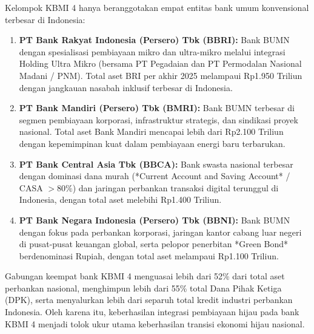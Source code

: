 \documentclass[12pt,a4paper]{article}
\numberwithin{equation}{section}
\begin{document}
\noindent
Kelompok KBMI 4 hanya beranggotakan empat entitas bank umum konvensional terbesar di Indonesia:
\begin{enumerate}
  \item \textbf{PT Bank Rakyat Indonesia (Persero) Tbk (BBRI):} Bank BUMN dengan spesialisasi pembiayaan mikro dan ultra-mikro melalui integrasi Holding Ultra Mikro (bersama PT Pegadaian dan PT Permodalan Nasional Madani / PNM). Total aset BRI per akhir 2025 melampaui Rp1.950 Triliun dengan jangkauan nasabah inklusif terbesar di Indonesia.
  \item \textbf{PT Bank Mandiri (Persero) Tbk (BMRI):} Bank BUMN terbesar di segmen pembiayaan korporasi, infrastruktur strategis, dan sindikasi proyek nasional. Total aset Bank Mandiri mencapai lebih dari Rp2.100 Triliun dengan kepemimpinan kuat dalam pembiayaan energi baru terbarukan.
  \item \textbf{PT Bank Central Asia Tbk (BBCA):} Bank swasta nasional terbesar dengan dominasi dana murah (*Current Account and Saving Account* / CASA $>80\%$) dan jaringan perbankan transaksi digital terunggul di Indonesia, dengan total aset melebihi Rp1.400 Triliun.
  \item \textbf{PT Bank Negara Indonesia (Persero) Tbk (BBNI):} Bank BUMN dengan fokus pada perbankan korporasi, jaringan kantor cabang luar negeri di pusat-pusat keuangan global, serta pelopor penerbitan *Green Bond* berdenominasi Rupiah, dengan total aset melampaui Rp1.100 Triliun.
\end{enumerate}

\noindent
Gabungan keempat bank KBMI 4 menguasai lebih dari 52\% dari total aset perbankan nasional, menghimpun lebih dari 55\% total Dana Pihak Ketiga (DPK), serta menyalurkan lebih dari separuh total kredit industri perbankan Indonesia. Oleh karena itu, keberhasilan integrasi pembiayaan hijau pada bank KBMI 4 menjadi tolok ukur utama keberhasilan transisi ekonomi hijau nasional.
\end{document}
